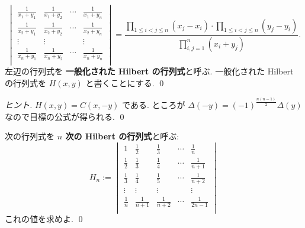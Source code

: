 \documentclass[12pt,twoside]{jarticle}
\begin{document}

\begin{question}
  \begin{equation*}
    \begin{vmatrix}
      \frac{1}{x_1+y_1} & \frac{1}{x_1+y_2} & \cdots & \frac{1}{x_1+y_n} \\
      \frac{1}{x_2+y_1} & \frac{1}{x_2+y_2} & \cdots & \frac{1}{x_2+y_n} \\
      \vdots            & \vdots            &        & \vdots \\
      \frac{1}{x_n+y_1} & \frac{1}{x_n+y_2} & \cdots & \frac{1}{x_n+y_n} \\
    \end{vmatrix}
    = \frac
    {\prod_{1\le i<j\le n}(x_j-x_i)\cdot \prod_{1\le i<j\le n}(y_j-y_i)}
    {\prod_{i,j=1}^n (x_i+y_j)}.
  \end{equation*}
  左辺の行列式を {\bf 一般化された Hilbert の行列式}と呼ぶ.
  一般化された Hilbert の行列式を $H(x,y)$ と書くことにする.
  \qed
\end{question}

\begin{proof}[ヒント]
  $H(x,y)=C(x,-y)$ である.
  ところが $\Delta(-y)=(-1)^{\frac{n(n-1)}{2}}\Delta(y)$ 
  なので目標の公式が得られる. \qed
\end{proof}


\begin{question}
  \label{q:Hilbert-det}
  次の行列式を {\bf $n$ 次の Hilbert の行列式}と呼ぶ:
  \begin{equation*}
    H_n :=
    \begin{vmatrix}
      1       & \frac12     & \frac13     & \cdots & \frac1n \\
      \frac12 & \frac13     & \frac14     & \cdots & \frac1{n+1} \\
      \frac13 & \frac14     & \frac15     & \cdots & \frac1{n+2} \\
      \vdots  & \vdots      & \vdots      &        & \vdots \\
      \frac1n & \frac1{n+1} & \frac1{n+2} & \cdots & \frac1{2n-1} \\
    \end{vmatrix}
  \end{equation*}
  これの値を求めよ. \qed
\end{question}
\end{document}

